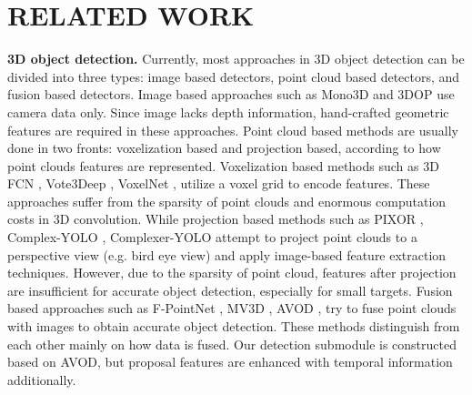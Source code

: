 \documentclass[letterpaper, 10 pt, conference]{ieeeconf}  %
\begin{document}
\section{RELATED WORK}

\textbf{3D object detection.} Currently, most approaches in 3D object detection can be divided into three types: image based detectors, point cloud based detectors, and fusion based detectors. Image based approaches such as Mono3D \cite{7780605} and 3DOP \cite{chen20183d} use camera data only. Since image lacks depth information, hand-crafted geometric features are required in these approaches. Point cloud based methods are usually done in two fronts: voxelization based and projection based, according to how point clouds features are represented. Voxelization based methods such as 3D FCN \cite{li20173d}, Vote3Deep \cite{engelcke2017vote3deep}, VoxelNet \cite{zhou2018voxelnet}, utilize a voxel grid to encode features. These approaches suffer from the sparsity of point clouds and enormous computation costs in 3D convolution. While projection based methods such as PIXOR \cite{yang2018pixor}, Complex-YOLO \cite{simon2018complex}, Complexer-YOLO \cite{Simon_2019_CVPR_Workshops} attempt to project point clouds to a perspective view (e.g. bird eye view) and apply image-based feature extraction techniques. However, due to the sparsity of point cloud, features after projection are insufficient for accurate object detection, especially for small targets. Fusion based approaches such as F-PointNet \cite{qi2018frustum}, MV3D \cite{chen2017multi}, AVOD \cite{ku2018joint}, try to fuse point clouds with images to obtain accurate object detection. These methods distinguish from each other mainly on how data is fused. Our detection submodule is constructed based on AVOD, but proposal features are enhanced with temporal information additionally.

\end{document}
